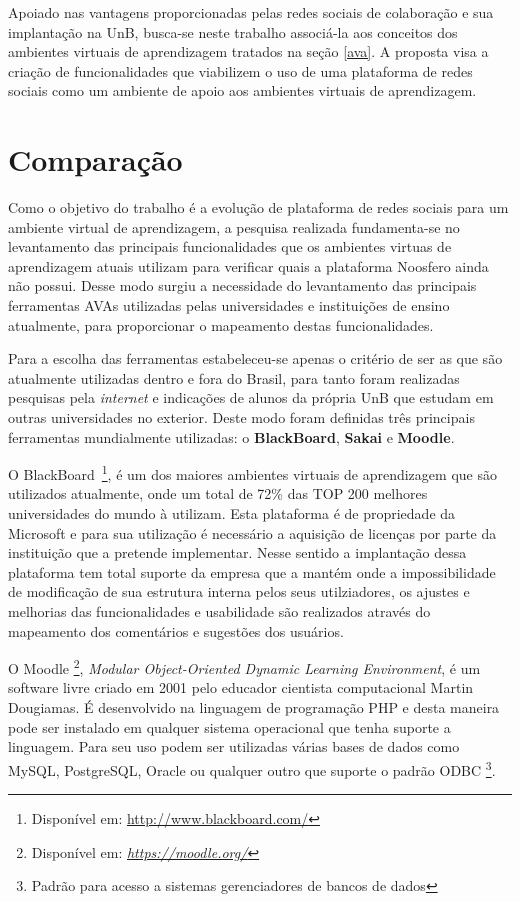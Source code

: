 Apoiado nas vantagens proporcionadas pelas redes sociais de colaboração e sua implantação na UnB, busca-se neste trabalho associá-la aos conceitos dos ambientes virtuais de aprendizagem tratados na seção \ref{ava}. A proposta visa a criação de funcionalidades que viabilizem o uso de uma plataforma de redes sociais como um ambiente de apoio aos ambientes virtuais de aprendizagem.

\section{Comparação}
\label{comparacao-ava}

Como o objetivo do trabalho é a evolução de plataforma de redes sociais para um ambiente virtual de aprendizagem, a pesquisa realizada fundamenta-se no levantamento das principais funcionalidades que os ambientes virtuas de aprendizagem atuais utilizam para verificar quais a plataforma Noosfero ainda não possui. Desse modo surgiu a necessidade do levantamento das principais ferramentas AVAs utilizadas pelas universidades e instituições de ensino atualmente, para proporcionar o mapeamento destas funcionalidades.

Para a escolha das ferramentas estabeleceu-se apenas o critério de ser as que são atualmente utilizadas dentro e fora do Brasil, para tanto foram realizadas pesquisas  pela \textit{internet} e indicações de alunos da própria UnB que estudam em outras universidades no exterior. Deste modo foram definidas três principais ferramentas mundialmente utilizadas: o \textbf{BlackBoard}, \textbf{Sakai} e \textbf{Moodle}.

O BlackBoard~\footnote{Disponível em: \url{http://www.blackboard.com/}}, é um dos maiores ambientes virtuais de aprendizagem que são utilizados atualmente, onde um total de 72\% das TOP 200 melhores universidades do mundo à utilizam. Esta plataforma é de propriedade da Microsoft e para sua utilização é necessário a aquisição de licenças por parte da instituição que a pretende implementar. Nesse sentido a implantação dessa plataforma tem total suporte da empresa que a mantém onde a impossibilidade de modificação de sua estrutura interna pelos seus utilziadores, os ajustes e melhorias das funcionalidades e usabilidade são realizados através do mapeamento dos comentários e sugestões dos usuários.

O Moodle \footnote{Disponível em: \textit{ \url{https://moodle.org/}}}, \textit{Modular Object-Oriented Dynamic Learning Environment}, é um software livre criado em 2001 pelo educador cientista computacional Martin Dougiamas. É desenvolvido na linguagem de programação PHP e desta maneira pode ser instalado em qualquer sistema operacional que tenha suporte a linguagem. Para seu uso podem ser utilizadas várias bases de dados como MySQL, PostgreSQL, Oracle ou qualquer outro que suporte o padrão ODBC \footnote{Padrão para acesso a sistemas gerenciadores de bancos de dados}.

